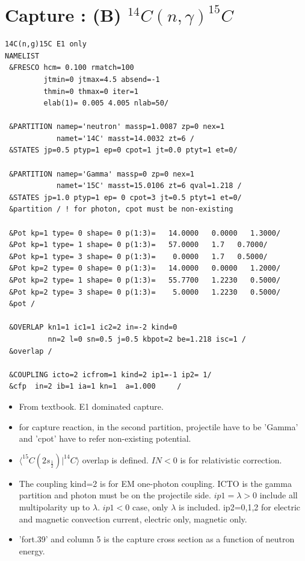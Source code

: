 \documentclass[11pt]{book}
\def\la{\langle}
\def\ra{\rangle}
\begin{document}
\section{Capture : (B) $^{14}C(n,\gamma)^{15}C$} 
\begin{small} \begin{lstlisting}[frame=single]
14C(n,g)15C E1 only
NAMELIST
 &FRESCO hcm= 0.100 rmatch=100 
         jtmin=0 jtmax=4.5 absend=-1
         thmin=0 thmax=0 iter=1 
         elab(1)= 0.005 4.005 nlab=50/

 &PARTITION namep='neutron' massp=1.0087 zp=0 nex=1 
            namet='14C' masst=14.0032 zt=6 /
 &STATES jp=0.5 ptyp=1 ep=0 cpot=1 jt=0.0 ptyt=1 et=0/

 &PARTITION namep='Gamma' massp=0 zp=0 nex=1 
            namet='15C' masst=15.0106 zt=6 qval=1.218 /
 &STATES jp=1.0 ptyp=1 ep= 0 cpot=3 jt=0.5 ptyt=1 et=0/
 &partition / ! for photon, cpot must be non-existing

 &Pot kp=1 type= 0 shape= 0 p(1:3)=   14.0000   0.0000   1.3000/                                     
 &Pot kp=1 type= 1 shape= 0 p(1:3)=   57.0000   1.7   0.7000/                                     
 &Pot kp=1 type= 3 shape= 0 p(1:3)=    0.0000   1.7   0.5000/                                     
 &Pot kp=2 type= 0 shape= 0 p(1:3)=   14.0000   0.0000   1.2000/                                     
 &Pot kp=2 type= 1 shape= 0 p(1:3)=   55.7700   1.2230   0.5000/                                     
 &Pot kp=2 type= 3 shape= 0 p(1:3)=    5.0000   1.2230   0.5000/                                     
 &pot / 

 &OVERLAP kn1=1 ic1=1 ic2=2 in=-2 kind=0 
          nn=2 l=0 sn=0.5 j=0.5 kbpot=2 be=1.218 isc=1 /
 &overlap / 

 &COUPLING icto=2 icfrom=1 kind=2 ip1=-1 ip2= 1/
 &cfp  in=2 ib=1 ia=1 kn=1  a=1.000     /
\end{lstlisting}\end{small}


\begin{itemize}
\item From textbook. E1 dominated capture. 
\item {\color{red} for capture reaction, in the second partition, projectile 
      have to be 'Gamma' and 'cpot' have to refer non-existing potential. }
\item $\la ^{15}C(2s_{\frac{1}{2}})|^{14}C\ra$ overlap is defined. $IN<0$ is for 
      relativistic correction. 
\item The coupling kind=2 is for EM one-photon coupling.  ICTO is the gamma partition and photon must be on the projectile side. $ip1=\lambda>0$ include all multipolarity 
 up to $\lambda$. $ip1<0$ case, only $\lambda$ is included. ip2=0,1,2
  for electric and magnetic convection current, electric only, magnetic only. 
\item 'fort.39' and column 5 is the capture cross section as a function of neutron energy.   
\end{itemize}
\end{document}
